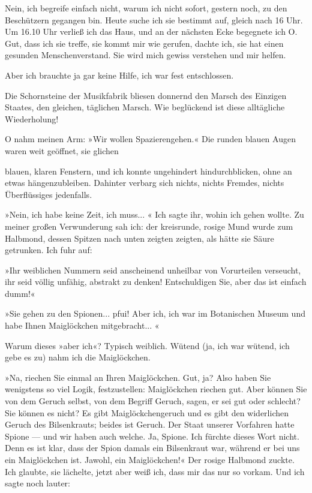 Nein, ich begreife einfach nicht, warum ich nicht sofort, gestern
noch, zu den Beschützern gegangen bin. Heute suche ich sie bestimmt
auf, gleich nach 16 Uhr. Um 16.10 Uhr verließ ich das Haus, und an
der nächsten Ecke begegnete ich O. Gut, dass ich sie treffe, sie
kommt mir wie gerufen, dachte ich, sie hat einen gesunden
Menschenverstand. Sie wird mich gewiss verstehen und mir helfen.

Aber ich brauchte ja gar keine Hilfe, ich war fest entschlossen.

Die Schornsteine der Musikfabrik bliesen donnernd den Marsch des
Einzigen Staates, den gleichen, täglichen Marsch. Wie beglückend
ist diese alltägliche Wiederholung!

O nahm meinen Arm: »Wir wollen Spazierengehen.« Die runden blauen
Augen waren weit geöffnet, sie glichen

blauen, klaren Fenstern, und ich konnte ungehindert
hindurchblicken, ohne an etwas hängenzubleiben. Dahinter verbarg
sich nichts, nichts Fremdes, nichts Überflüssiges jedenfalls.

»Nein, ich habe keine Zeit, ich muss... « Ich sagte ihr, wohin ich
gehen wollte. Zu meiner großen Verwunderung sah ich: der
kreisrunde, rosige Mund wurde zum Halbmond, dessen Spitzen nach
unten zeigten zeigten, als hätte sie Säure getrunken. Ich fuhr
auf:

»Ihr weiblichen Nummern seid anscheinend unheilbar von Vorurteilen
verseucht, ihr seid völlig unfähig, abstrakt zu denken!
Entschuldigen Sie, aber das ist einfach dumm!«

»Sie gehen zu den Spionen... pfui! Aber ich, ich war im Botanischen
Museum und habe Ihnen Maiglöckchen mitgebracht... «

Warum dieses »aber ich«? Typisch weiblich. Wütend (ja, ich war
wütend, ich gebe es zu) nahm ich die Maiglöckchen.

»Na, riechen Sie einmal an Ihren Maiglöckchen. Gut, ja? Also haben
Sie wenigstens so viel Logik, festzustellen: Maiglöckchen riechen
gut. Aber können Sie von dem Geruch selbst, von dem Begriff Geruch,
sagen, er sei gut oder schlecht? Sie können es nicht? Es gibt
Maiglöckchengeruch und es gibt den widerlichen Geruch des
Bilsenkrauts; beides ist Geruch. Der Staat unserer Vorfahren hatte
Spione — und wir haben auch welche. Ja, Spione. Ich fürchte dieses
Wort nicht. Denn es ist klar, dass der Spion damals ein Bilsenkraut
war, während er bei uns ein Maiglöckchen ist. Jawohl, ein
Maiglöckchen!« Der rosige Halbmond zuckte. Ich glaubte, sie
lächelte, jetzt aber weiß ich, dass mir das nur so vorkam. Und ich
sagte noch lauter:

